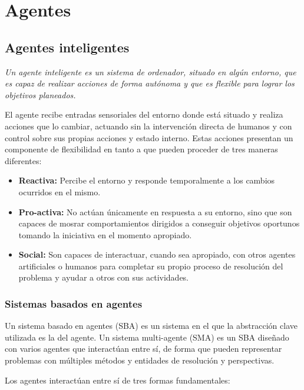 \chapter{Agentes}

\section{Agentes inteligentes}

\begin{displayquote}
\textit{Un agente inteligente es un sistema de ordenador, situado en algún entorno, que es capaz de realizar acciones de forma autónoma y que es flexible para lograr los objetivos planeados.}
\end{displayquote}

El agente recibe entradas sensoriales del entorno donde está situado y realiza acciones que lo cambiar, actuando sin la intervención directa de humanos y con control sobre sus propias acciones y estado interno.
Estas acciones presentan un componente de flexibilidad en tanto a que pueden proceder de tres maneras diferentes:

\begin{itemize}
	\item\textbf{Reactiva:} Percibe el entorno y responde temporalmente a los cambios ocurridos en el mismo.
	\item\textbf{Pro-activa:} No actúan únicamente en respuesta a su entorno, sino que son capaces de mosrar comportamientos dirigidos a conseguir objetivos oportunos tomando la iniciativa en el momento apropiado.
	\item\textbf{Social:} Son capaces de interactuar, cuando sea apropiado, con otros agentes artificiales o humanos para completar su propio proceso de resolución del problema y ayudar a otros con sus actividades.
\end{itemize}

\subsection{Sistemas basados en agentes}

Un sistema basado en agentes (SBA) es un sistema en el que la abstracción clave utilizada es la del agente.
Un sistema multi-agente (SMA) es un SBA diseñado con varios agentes que interactúan entre sí, de forma que pueden representar problemas con múltiples métodos y entidades de resolución y perspectivas.

Los agentes interactúan entre sí de tres formas fundamentales:

